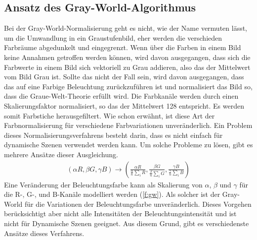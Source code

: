   \subsection{Ansatz des Gray-World-Algorithmus}\label{s.gw}
Bei der Gray-World-Normalisierung \cite{buenaposada2001variations} geht es nicht, wie der Name vermuten lässt, um die Umwandlung in ein Graustufenbild, eher werden die verschieden Farbräume abgedunkelt und eingegrenzt. Wenn über die Farben in einem Bild keine Annahmen getroffen werden können, wird davon ausgegangen, dass sich die Farbwerte in einem Bild sich vektoriell zu Grau addieren, also das der Mittelwert vom Bild Grau ist. Sollte das nicht der Fall sein, wird davon ausgegangen, dass das auf eine Farbige Beleuchtung zurückzuführen ist und normalisiert das Bild so, dass die Graue-Welt-Theorie erfüllt wird. Die Farbkanäle werden durch einen Skalierungsfaktor normalisiert, so das der Mittelwert 128 entspricht. Es werden somit Farbstiche herausgefiltert. Wie schon erwähnt, ist diese Art der Farbnormalisierung für verschiedene Farbvariationen unveränderlich. Ein Problem dieses Normalisierungsverfahrens besteht darin, dass es nicht einfach für dynamische Szenen verwendet werden kann. Um solche Probleme zu lösen, gibt es mehrere Ansätze dieser Ausgleichung.
\begin{align} \label{f:gw} (\alpha R, \beta G, \gamma B) \rightarrow\left(\frac{\alpha R} {\frac{\alpha}{n} \sum_{i} R}, \frac{\beta G} {\frac{\beta}{n} \sum_{i} G}, \frac{\gamma B} {\frac{\gamma}{n} \sum_{i} B} \right) \end{align}
Eine Veränderung der Beleuchtungsfarbe kann als Skalierung von $\alpha$, $\beta$ und $\gamma$ für die R-, G-, und B-Kanäle modelliert werden (\ref{f:gw}). Als solcher ist der Gray-World für die Variationen der Beleuchtungsfarbe unveränderlich. Dieses Vorgehen berücksichtigt aber nicht alle Intensitäten der Beleuchtungsintensität und ist nicht für Dynamische Szenen geeignet. Aus diesem Grund, gibt es verschiedenste Ansätze dieses Verfahrens.
